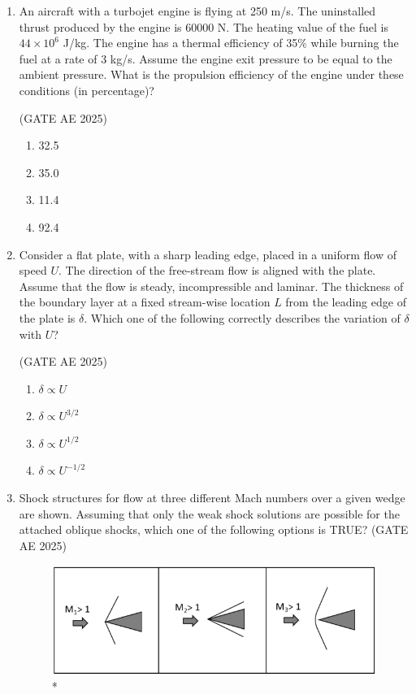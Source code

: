\documentclass[journal,12pt,onecolumn]{IEEEtran}
\theoremstyle{remark}
\begin{document}
\begin{flushleft}
\begin{enumerate}
\item An aircraft with a turbojet engine is flying at 250 m/s. The uninstalled thrust produced by the engine is 60000 N. The heating value of the fuel is $44 \times 10^6$ J/kg. The engine has a thermal efficiency of 35\% while burning the fuel at a rate of 3 kg/s. Assume the engine exit pressure to be equal to the ambient pressure. What is the propulsion efficiency of the engine under these conditions (in percentage)?

\hfill (GATE AE 2025)

\begin{enumerate}
    \item 32.5
    \item 35.0
    \item 11.4
    \item 92.4
\end{enumerate}

\item  Consider a flat plate, with a sharp leading edge, placed in a uniform flow of speed $U$. The direction of the free-stream flow is aligned with the plate. Assume that the flow is steady, incompressible and laminar. The thickness of the boundary layer at a fixed stream-wise location $L$ from the leading edge of the plate is $\delta$. Which one of the following correctly describes the variation of $\delta$ with $U$?  

\hfill (GATE AE 2025)

\begin{enumerate}
\item $\delta \propto U$  
\item $\delta \propto U^{3/2}$  
\item $\delta \propto U^{1/2}$  
\item $\delta \propto U^{-1/2}$ 
\end{enumerate} 


\item Shock structures for flow at three different Mach numbers over a given wedge are shown. Assuming that only the weak shock solutions are possible for the attached oblique shocks, which one of the following options is TRUE?  
\hfill (GATE AE 2025)

\begin{figure}[H]
\includegraphics[width=0.5\columnwidth]{figs/43.png}
\caption{*}
    \label{fig:placeholder}
\end{figure}


\end{enumerate}
\end{flushleft}
\end{document}
